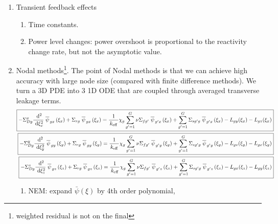 \documentclass{school-22.211-notes}
\begin{document}
\begin{enumerate}
\item Transient feedback effects
  \begin{enumerate}
  \item Time constants. 
  \item Power level changes: power overshoot is proportional to the reactivity change rate, but not the asymptotic value. 
  \end{enumerate}

\clearpage
\item Nodal methods\footnote{weighted residual is not on the final}. The point of Nodal methods is that we can achieve high accuracy with large node size (compared with finite difference methods). We turn a 3D PDE into 3 1D ODE that are coupled through averaged transverse leakage terms. 
    \begin{align*}
      \boxed{ - \Sigma_{Dg}^x \frac{\mbox{ }\mathrm{d}^2}{\mbox{ }\mathrm{d} \xi_x^2} \left.\overline{\psi} \right._{gx} (\xi_x) + \Sigma_{rg} \left.\overline{\psi} \right._{gx} (\xi_x) = \frac{1}{\left. k_{\mathrm{eff}} \right.} \chi_g \displaystyle\sum_{g'=1}^G \nu \Sigma_{fg'} \left.\overline{\psi} \right._{g'x} (\xi_x) + \displaystyle\sum_{g'=1}^G \Sigma_{sg'g} \left.\overline{\psi} \right._{g'x} (\xi_x) - L_{gy} (\xi_x) - L_{gz} (\xi_x) }    \\
   \boxed{ - \Sigma_{Dg}^y \frac{\mbox{ }\mathrm{d}^2}{\mbox{ }\mathrm{d} \xi_y^2} \left.\overline{\psi} \right._{gy} (\xi_y) + \Sigma_{rg} \left.\overline{\psi} \right._{gy} (\xi_y) = \frac{1}{\left. k_{\mathrm{eff}} \right.} \chi_g \displaystyle\sum_{g'=1}^G \nu \Sigma_{fg'} \left.\overline{\psi} \right._{g'y} (\xi_y) + \displaystyle\sum_{g'=1}^G \Sigma_{sg'g} \left.\overline{\psi} \right._{g'y} (\xi_y) - L_{gz} (\xi_y) - L_{gx} (\xi_y) }  \\
     \boxed{ - \Sigma_{Dg}^z \frac{\mbox{ }\mathrm{d}^2}{\mbox{ }\mathrm{d} \xi_z^2} \left.\overline{\psi} \right._{gz} (\xi_z) + \Sigma_{rg} \left.\overline{\psi} \right._{gz} (\xi_z) = \frac{1}{\left. k_{\mathrm{eff}} \right.} \chi_g \displaystyle\sum_{g'=1}^G \nu \Sigma_{fg'} \left.\overline{\psi} \right._{g'z} (\xi_z) + \displaystyle\sum_{g'=1}^G \Sigma_{sg'g} \left.\overline{\psi} \right._{g'z} (\xi_z) - L_{gx} (\xi_z) - L_{gy} (\xi_z) } 
    \end{align*}
  \begin{enumerate}
    \item NEM: expand $\bar{\psi}(\xi)$ by 4th order polynomial, 


\end{enumerate}
\end{enumerate}
\end{document}
